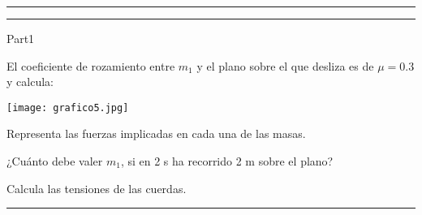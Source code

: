 \documentclass[10pt]{article}
\begin{document}
\vspace*{-2.7cm}
\noindent\rule{1.05\textwidth}{0,4pt}
\noindent{} 
\vspace{-0,35cm}
\noindent{}\vspace{0,65cm}
\noindent {}\vspace{-0,25cm}
\noindent\rule{1.05\textwidth}{0,4pt}
\vspace*{-1.5cm}

\makeatletter
\renewcommand{\eqleftmargin}[2]{\makebox[0pt][r]{\marginpointtext{#1}{#2}%
    \setlength{\@tempdima}{\eqemargin}%
    \hspace*{\@tempdima}}}
\makeatother
\lhead{}
\chead{}
\rhead{}

\begin{exam}{Part1}
\forceNoColor
\useFillerDefault
\fillTypeDots
{}
\eqWLSpacing{18pt}
\vspace*{1cm} \begin{problem*}[10ea] 
El coeficiente de rozamiento entre $m_1$ y el plano sobre el que desliza es de $\mu=0.3$ y calcula: \\
\begin{minipage}{\linewidth}
\begin{varwidth}{0.5\linewidth}
\texttt{[image: grafico5.jpg]}
\end{varwidth}\hfill
\begin{varwidth}{0.5\linewidth}
\begin{parts}
\item  Representa las fuerzas implicadas en cada una de las masas.
\item ¿Cuánto debe valer $m_1$, si en 2 s ha recorrido 2 m sobre el plano?
\item Calcula las tensiones de las cuerdas.
\end{parts}
\end{varwidth}
\end{minipage}
\end{problem*}\vfill
\hrule
\vspace*{0.2cm}
\end{exam} 
\end{document}
